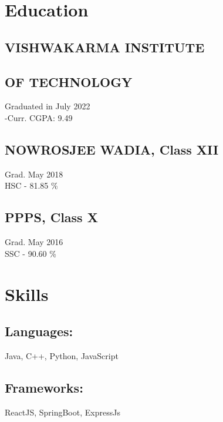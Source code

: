 \documentclass[]{hieudo-build}
\begin{document}
\begin{minipage}[t]{0.34\textwidth} 

\section{Education} 

\subsection{VISHWAKARMA INSTITUTE}
\subsection{OF TECHNOLOGY}
Graduated in July 2022 \\
{\makebl -Curr. CGPA: 9.49} \\
\sectionsep

\subsection{NOWROSJEE WADIA, Class XII}
Grad. May 2018 \\
HSC - 81.85 \% \\
\sectionsep

\subsection{PPPS, Class X}
Grad. May 2016 \\
SSC - 90.60 \% \\

\sectionsep

\section{Skills}
\subsection{Languages:}
Java, C++, Python, JavaScript\\ 

\subsection{Frameworks:}
ReactJS, SpringBoot, ExpressJs \\


\end{minipage}
\end{document}
